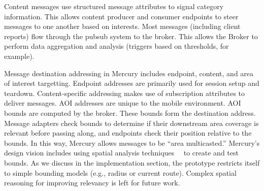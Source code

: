 Content messages use structured 
message attributes to signal category information. This allows content
producer and consumer endpoints to steer messages to one another based
on interests. Most messages (including client reports) flow through
the pubsub system to the broker. This allows the Broker to perform
data aggregation and analysis (triggers based on thresholds, for
example).

Message destination addressing in Mercury includes endpoint, content,
and area of interest targetting. Endpoint addresses are primarily used
for session setup and teardown. Content-specific addressing makes use
of subscription attributes to deliver messages. AOI addresses are
unique to the mobile environment. AOI bounds are computed by the
broker. These bounds form the destination address. Message adapters
check bounds to determine if their downstream area coverage is
relevant before passing along, and endpoints check their position
relative to the bounds.  In this way, Mercury allows messages to be
``area multicasted.''  Mercury's design vision includes using spatial
analysis techniques~\cite{sp-an1}~\cite{sp-an2} to create and test
bounds.  As we discuss in the implementation section, the prototype
restricts itself to simple bounding models (e.g., radius or current
route). Complex spatial reasoning for improving relevancy is left for
future work.
